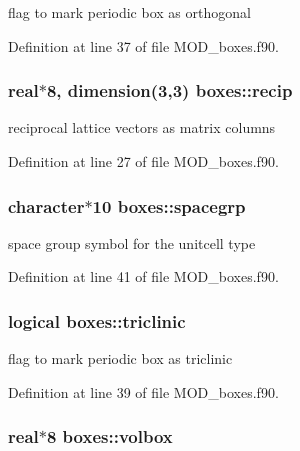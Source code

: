 flag to mark periodic box as orthogonal 



Definition at line 37 of file M\-O\-D\-\_\-boxes.\-f90.

\hypertarget{classboxes_a0c87c5b0b386dcdd53ab94c59b07f5a8}{
\subsubsection[{recip}]{\setlength{\rightskip}{0pt plus 5cm}real$\ast$8, dimension(3,3) boxes\-::recip}}\label{classboxes_a0c87c5b0b386dcdd53ab94c59b07f5a8}


reciprocal lattice vectors as matrix columns 



Definition at line 27 of file M\-O\-D\-\_\-boxes.\-f90.

\hypertarget{classboxes_a156da4dc49d38d44e617030b4118e37d}{
\subsubsection[{spacegrp}]{\setlength{\rightskip}{0pt plus 5cm}character$\ast$10 boxes\-::spacegrp}}\label{classboxes_a156da4dc49d38d44e617030b4118e37d}


space group symbol for the unitcell type 



Definition at line 41 of file M\-O\-D\-\_\-boxes.\-f90.

\hypertarget{classboxes_ab96dd924f424ba92884f3a7adf3623a6}{
\subsubsection[{triclinic}]{\setlength{\rightskip}{0pt plus 5cm}logical boxes\-::triclinic}}\label{classboxes_ab96dd924f424ba92884f3a7adf3623a6}


flag to mark periodic box as triclinic 



Definition at line 39 of file M\-O\-D\-\_\-boxes.\-f90.

\hypertarget{classboxes_aca6fdacea9feeb56829de94a10b36e4c}{
\subsubsection[{volbox}]{\setlength{\rightskip}{0pt plus 5cm}real$\ast$8 boxes\-::volbox}}\label{classboxes_aca6fdacea9feeb56829de94a10b36e4c}


